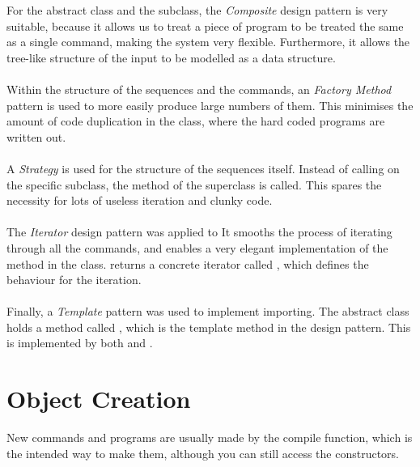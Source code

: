 For the  abstract class and the  subclass, the \textit{Composite} design pattern is very suitable, because it allows us to treat a piece of program to be treated the same as a single command, making the system very flexible. Furthermore, it allows the tree-like structure of the input to be modelled as a data structure. \\~\\

Within the structure of the sequences and the commands, an \textit{Factory Method} pattern is used to more easily produce large numbers of them. This minimises the amount of code duplication in the  class, where the hard coded programs are written out.\\~\\

A \textit{Strategy} is used for the structure of the sequences itself. Instead of calling on the specific subclass, the  method of the superclass is called. This spares the necessity for lots of useless iteration and clunky code. \\~\\

The \textit{Iterator} design pattern was applied to It smooths the process of iterating through all the commands, and enables a very elegant implementation of the  method in the  class.  returns a concrete iterator called , which defines the behaviour for the iteration. \\~\\

Finally, a \textit{Template} pattern was used to implement importing. The  abstract class holds a method called , which is the template method in the design pattern. This is implemented by both  and . 

\section{Object Creation}
New commands and programs are usually made by the compile function, which is the intended way to make them, although you can still access the constructors. 
